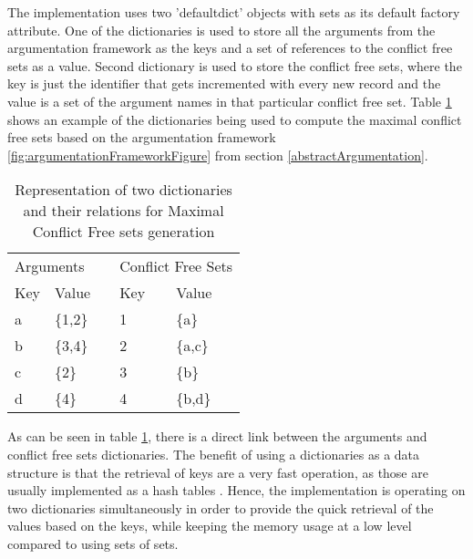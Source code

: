 The implementation uses two 'defaultdict' objects with sets as its default factory attribute. One of the dictionaries is used to store all the arguments from the argumentation framework as the keys and a set of references to the conflict free sets as a value. Second dictionary is used to store the conflict free sets, where the key is just the identifier that gets incremented with every new record and the value is a set of the argument names in that particular conflict free set. Table \ref{table:dictsRepresentation} shows an example of the dictionaries being used to compute the maximal conflict free sets based on the argumentation framework \ref{fig:argumentationFrameworkFigure} from section \ref{abstractArgumentation}.

\begin{table}[h]
	\centering
	\caption{Representation of two dictionaries and their relations for Maximal Conflict Free sets generation}
	\label{table:dictsRepresentation}
	\begin{tabular}{lllll}
		\multicolumn{2}{l}{Arguments}                            &                       & \multicolumn{2}{l}{Conflict Free Sets}                  \\ \cline{1-2} \cline{4-5} 
		\multicolumn{1}{|l|}{Key} & \multicolumn{1}{l|}{Value}   & \multicolumn{1}{l|}{} & \multicolumn{1}{l|}{Key} & \multicolumn{1}{l|}{Value}   \\ \cline{1-2} \cline{4-5} 
		\multicolumn{1}{|l|}{a}   & \multicolumn{1}{l|}{\{1,2\}} & \multicolumn{1}{l|}{} & \multicolumn{1}{l|}{1}   & \multicolumn{1}{l|}{\{a\}}   \\ \cline{1-2} \cline{4-5} 
		\multicolumn{1}{|l|}{b}   & \multicolumn{1}{l|}{\{3,4\}} & \multicolumn{1}{l|}{} & \multicolumn{1}{l|}{2}   & \multicolumn{1}{l|}{\{a,c\}} \\ \cline{1-2} \cline{4-5} 
		\multicolumn{1}{|l|}{c}   & \multicolumn{1}{l|}{\{2\}}   & \multicolumn{1}{l|}{} & \multicolumn{1}{l|}{3}   & \multicolumn{1}{l|}{\{b\}}   \\ \cline{1-2} \cline{4-5} 
		\multicolumn{1}{|l|}{d}   & \multicolumn{1}{l|}{\{4\}}   & \multicolumn{1}{l|}{} & \multicolumn{1}{l|}{4}   & \multicolumn{1}{l|}{\{b,d\}} \\ \cline{1-2} \cline{4-5} 
	\end{tabular}
\end{table}

As can be seen in table \ref{table:dictsRepresentation}, there is a direct link between the arguments and conflict free sets dictionaries. The benefit of using a dictionaries as a data structure is that the retrieval of keys are a very fast operation, as those are usually implemented as a hash tables \citep{pythonDictionary}. Hence, the implementation is operating on two dictionaries simultaneously in order to provide the quick retrieval of the values based on the keys, while keeping the memory usage at a low level compared to using sets of sets.

